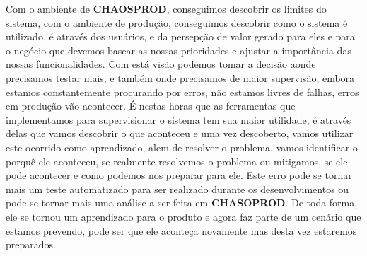       Com o ambiente de \textbf{CHAOSPROD}, conseguimos descobrir os limites do
      sistema, com o ambiente de produção, conseguimos descobrir como o sistema é
      utilizado, é através dos usuários, e da persepção de valor gerado para eles
      e para o negócio que devemos basear as nossas prioridades e ajustar a
      importância das nossas funcionalidades. Com está visão podemos tomar a decisão
      aonde precisamos testar mais, e também onde precisamos de maior supervisão,
      embora estamos constantemente procurando por erros, não estamos livres de
      falhas, erros em produção vão acontecer. É nestas horas que as ferramentas
      que implementamos para supervisionar o sistema tem sua maior utilidade, é
      através delas que vamos descobrir o que aconteceu e uma vez descoberto, vamos
      utilizar este ocorrido como aprendizado, alem de resolver o problema, vamos
      identificar o porquê ele aconteceu, se realmente resolvemos o problema ou
      mitigamos, se ele pode acontecer e como podemos nos preparar para ele. Este
      erro pode se tornar mais um teste automatizado para ser realizado durante os
      desenvolvimentos ou pode se tornar mais uma análise a ser feita em
      \textbf{CHASOPROD}. De toda forma, ele se tornou um aprendizado para o produto
      e agora faz parte de um cenário que estamos prevendo, pode ser que ele
      aconteça novamente mas desta vez estaremos preparados.

